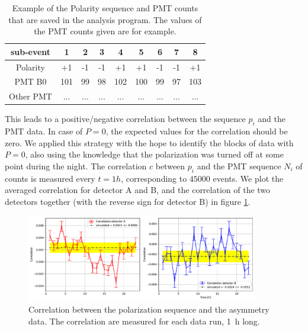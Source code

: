\begin{table}[hbtp]
\centering
\begin{tabular}{c|c|c|c|c|c|c|c|c}
\hline 
sub-event & 1 & 2 & 3 & 4 & 5 & 6 & 7 & 8 \\ 
\hline 
Polarity & +1 & -1 & -1 & +1 & +1 & -1 & -1 & +1 \\ 
PMT B0 & 101 & 99 & 98 & 102 & 100 & 99 & 97 & 103 \\ 
Other PMT & ... & ... & ... & ... & ... & ... & ... & ... \\ 
\hline
\end{tabular}
\caption{Example of the Polarity sequence and PMT counts that are saved in the analysis program. The values of the PMT counts given are for example.}
\label{tab:PolarizationSequence}
\end{table}

This leads to a positive/negative correlation between the sequence $p_{i}$ and the PMT data. In case of $P = 0$, the expected values for the correlation should be zero.
We applied this strategy with the hope to identify the blocks of data with $P = 0$, also using the knowledge that the polarization was turned off at some point during the night. The correlation $c$ between $p_{i}$ and the PMT sequence $N_{i}$ of counts is measured every $t = 1 h$, corresponding to $45000$ events. We plot the averaged correlation for detector A and B, and the correlation of the two detectors together (with the reverse sign for detector B) in figure \ref{fig:PolarityCheck}.

\begin{figure}[!ht]
\centering
\includegraphics[width = 0.9\textwidth]{Analysis/Dataselection/Correlation.pdf}
\caption{Correlation between the polarization sequence and the asymmetry data. The correlation are measured for each data run, \SI{1}{\hour} long.}
\label{fig:PolarityCheck}
\end{figure}

